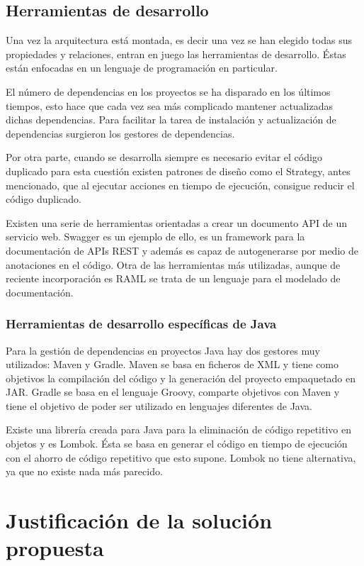 \documentclass[12pt]{report} %
\begin{document}
\section{Herramientas de desarrollo}

Una vez la arquitectura está montada, es decir una vez se han elegido todas sus propiedades y relaciones, entran en juego las herramientas de desarrollo. Éstas están enfocadas en un lenguaje de programación en particular.

El número de dependencias en los proyectos se ha disparado en los últimos tiempos, esto hace que cada vez sea más complicado mantener actualizadas dichas dependencias. Para facilitar la tarea de instalación y actualización de dependencias surgieron los gestores de dependencias.

Por otra parte, cuando se desarrolla siempre es necesario evitar el código duplicado para esta cuestión existen patrones de diseño como el Strategy, antes mencionado, que al ejecutar acciones en tiempo de ejecución, consigue reducir el código duplicado.

Existen una serie de herramientas orientadas a crear un documento API de un servicio web. Swagger es un ejemplo de ello, es un framework para la documentación de APIs REST y además es capaz de autogenerarse por medio de anotaciones en el código. Otra de las herramientas más utilizadas, aunque de reciente incorporación es RAML se trata de un lenguaje para el modelado de documentación.

\subsection{Herramientas de desarrollo específicas de Java}

Para la gestión de dependencias en proyectos Java hay dos gestores muy utilizados: Maven y Gradle. Maven se basa en ficheros de XML y tiene como objetivos la compilación del código y la generación del proyecto empaquetado en JAR. Gradle se basa en el lenguaje Groovy, comparte objetivos con Maven y tiene el objetivo de poder ser utilizado en lenguajes diferentes de Java. 

Existe una librería creada para Java para la eliminación de código repetitivo en objetos y es Lombok.
Ésta se basa en generar el código en tiempo de ejecución con el ahorro de código repetitivo que esto supone. Lombok no tiene alternativa, ya que no existe nada más parecido.

\chapter{Justificación de la solución propuesta}
\end{document}
